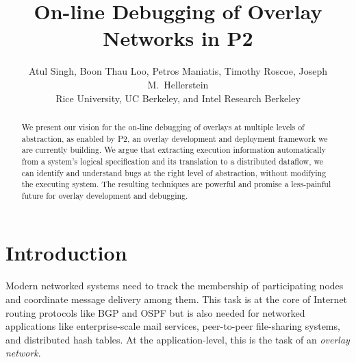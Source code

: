 \documentclass[10pt,twocolumn]{article}
\def\Sys{P2\xspace}
\begin{document}
\title{On-line Debugging of Overlay Networks in \Sys}
\author{Atul Singh, Boon Thau Loo, Petros Maniatis, Timothy Roscoe, Joseph M.\ Hellerstein\\
Rice University, UC Berkeley, and Intel Research Berkeley}
\date{}
\maketitle
\thispagestyle{plain}

\begin{abstract}
We present our vision for the on-line debugging of overlays at multiple
levels of abstraction, as enabled by P2, an overlay development and
deployment framework we are currently building.  We argue that
extracting execution information automatically from a system's logical
specification and its translation to a distributed dataflow, we can
identify and understand bugs at the right level of
abstraction, without modifying the executing system. The resulting
techniques are powerful and promise a less-painful future for overlay
development and debugging.
\end{abstract}



\section{Introduction}
\label{sec:intro}

Modern networked systems need to track the membership of 
participating nodes and coordinate message delivery among them.  This
task is at the core of Internet routing protocols like BGP and OSPF
but is also needed for networked 
applications like enterprise-scale mail services, peer-to-peer
file-sharing systems, and distributed hash tables.  At the
application-level, this is
the task of an {\em overlay network}.

\end{document}
